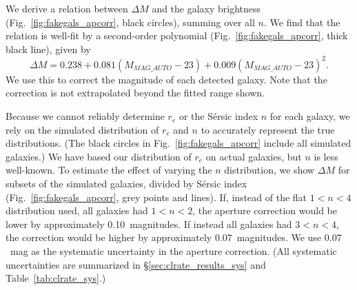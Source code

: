 We derive a relation between $\Delta M$ and the galaxy brightness
(Fig.~\ref{fig:fakegals_apcorr}, black circles), summing over all
$n$. We find that the relation is well-fit by a second-order
polynomial (Fig.~\ref{fig:fakegals_apcorr}, thick black line), given
by
\begin{equation}
\Delta M = 0.238 + 0.081(M_{MAG\_AUTO}-23) + 0.009(M_{MAG\_AUTO} -23)^2.
\end{equation}
We use this to correct the magnitude of each detected galaxy. Note
that the correction is not extrapolated beyond the fitted range shown.

Because we cannot reliably determine $r_e$ or the S{\'e}rsic index $n$
for each galaxy, we rely on the simulated distribution of $r_e$ and
$n$ to accurately represent the true distributions. (The black circles
in Fig.~\ref{fig:fakegals_apcorr} include all simulated galaxies.)  We
have based our distribution of $r_e$ on actual galaxies, but $n$ is
less well-known. To estimate the effect of varying the $n$
distribution, we show $\Delta M$ for subsets of the simulated
galaxies, divided by S{\'e}rsic index (Fig.~\ref{fig:fakegals_apcorr},
grey points and lines).  If, instead of the flat $1<n<4$ distribution
used, all galaxies had $1<n<2$, the aperture correction would be lower
by approximately 0.10~magnitudes. If instead all galaxies had
$3<n<4$, the correction would be higher by approximately
$0.07$~magnitudes. We use $0.07$~mag as the systematic uncertainty in
the aperture correction. (All systematic uncertainties are summarized
in \S\ref{sec:clrate_results_sys} and Table~\ref{tab:clrate_sys}.)

\vspace{1in}
